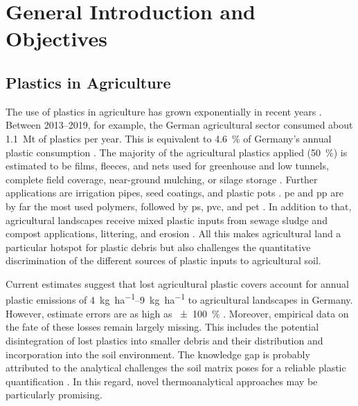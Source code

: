 
\chapter{General Introduction and Objectives}
\label{ch:intro}

\section{Plastics in Agriculture}

The use of plastics in agriculture has grown exponentially in recent years \citep{MormileWorld2017}.
Between \numrange[range-phrase={ and }]{2013}{2019}, for example, the German agricultural sector consumed about \SI{1.1}{\mega\tonne} of plastics per year. This is equivalent to \SI{4.6}{\percent} of Germany's annual plastic consumption \citep{BertlingKunststoffe2021}. The majority of the agricultural plastics applied (\SI{50}{\percent}) is estimated to be films, fleeces, and nets used for greenhouse and low tunnels, complete field coverage, near-ground mulching, or silage storage \citep{MormileWorld2017,BertlingKunststoffe2021}.
Further applications are irrigation pipes, seed coatings, and plastic pots \citep{BertlingKunststoffe2021}. \Ac{pe} and \ac{pp} are by far the most used polymers, followed by \ac{ps}, \ac{pvc}, and \ac{pet} \citep{PlasticsEuropePlastics2019,ZhangNonbiodegradable2021}. In addition to that, agricultural landscapes receive mixed plastic inputs from sewage sludge and compost applications, littering, and erosion \citep{HurleyFate2018,BlasingPlastics2018,StubbinsPlastics2021}. All this makes agricultural land a particular hotspot for plastic debris \citep{CorradiniMicroplastics2021,ZhangNonbiodegradable2021} but also challenges the quantitative discrimination of the different sources of plastic inputs to agricultural soil.

Current estimates suggest that lost agricultural plastic covers account for annual plastic emissions of \SIrange{4}{9}{\kilo\gram\per\hectare} to agricultural landscapes in Germany. However, estimate errors are as high as \SI{+-100}{\percent} \citep{BertlingKunststoffe2021}. Moreover, empirical data on the fate of these losses remain largely missing. This includes the potential disintegration of lost plastics into smaller debris and their distribution and incorporation into the soil environment. The knowledge gap is probably attributed to the analytical challenges the soil matrix poses for a reliable plastic quantification \citep{QiBehavior2020}. In this regard, novel thermoanalytical approaches may be particularly promising.

